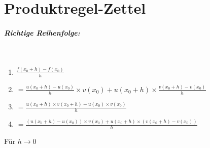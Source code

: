 \documentclass[12pt, a4paper]{report}
\begin{document}
	
	\chapter{Produktregel-Zettel}
	
	\paragraph{Richtige Reihenfolge:} \mbox{} \\
	
	\begin{enumerate}
		\item 	$\frac{f(x_0 + h) - f(x_0)}{h}$
		\item $= \frac{u(x_0 + h) - u(x_0)}{h} \times v (x_0) + u(x_0 + h) \times \frac{v(x_0 +h) - v(x_0)}{h}$
		\item $= \frac{u(x_0 + h) \times v(x_0 + h) - u(x_0) \times v(x_0)}{h}$
		\item $= \frac{(u(x_0 + h) - u(x_0)) \times v(x_0) + u(x_0 + h) \times (v(x_0 + h) - v(x_0))}{h}$
	\end{enumerate}
	
	Für $h\to0$
\end{document}
